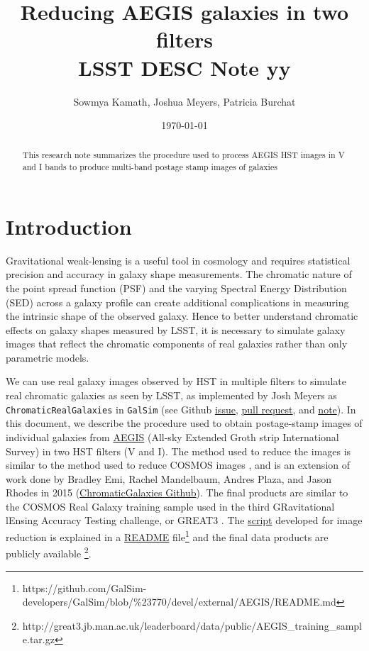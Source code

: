 \documentclass[a4paper,11pt]{article}
\title{Reducing AEGIS galaxies in two filters \\
LSST DESC Note yy}
\author{Sowmya Kamath, Joshua Meyers, Patricia Burchat}
\date{\today}
\begin{document}
\maketitle

\begin{abstract}
This research note summarizes the procedure used to process AEGIS HST images in V and I bands to produce multi-band postage stamp images of galaxies
\end{abstract}

\section{Introduction}
Gravitational weak-lensing is a useful tool in cosmology and requires statistical precision and accuracy in galaxy shape measurements. The chromatic nature of the point spread function (PSF) and the varying Spectral Energy Distribution (SED) across a galaxy profile can create additional complications in measuring the intrinsic shape of the observed galaxy. Hence to better understand chromatic effects on galaxy shapes measured by LSST, it is necessary to simulate galaxy images that reflect the chromatic components of real galaxies rather than only parametric models. 

We can use real galaxy images observed by HST in multiple filters to simulate real chromatic galaxies as seen by LSST, as implemented by Josh Meyers as {\tt ChromaticRealGalaxies} in {\tt GalSim} (see Github
\href{https://github.com/GalSim-developers/GalSim/issues/640}{issue}, 
\href{https://github.com/GalSim-developers/GalSim/pull/687}{pull request},
and 
\href{https://github.com/GalSim-developers/GalSim/blob/\%23640/devel/modules/CGNotes.pdf}{note}). 
In this document, we describe the procedure used to obtain postage-stamp images of individual galaxies from 
\href{http://aegis.ucolick.org/tech_overview.html}{AEGIS} 
(All-sky Extended Groth strip International Survey) in two HST filters (V and I). The method used to reduce the images is similar to the method used  to reduce COSMOS images \citep{Leauthaud2007}, and is an extension of work done by Bradley Emi, Rachel Mandelbaum, Andres Plaza, and Jason Rhodes in 2015 
(\href{https://github.com/bradleyemi/ChromaticGalaxies}{ChromaticGalaxies Github}). The final products are similar to the COSMOS Real Galaxy training sample used in the third GRavitational lEnsing Accuracy Testing challenge, or GREAT3 \citep{Mandelbaum2014}. The \href{https://github.com/sowmyakth/true_gal_colors}{script} developed for image reduction is explained in a \href{https://github.com/GalSim-developers/GalSim/blob/\%23770/devel/external/AEGIS/README.md}{README} file\footnote{https://github.com/GalSim-developers/GalSim/blob/\%23770/devel/external/AEGIS/README.md} and the final data products are publicly available \footnote{http://great3.jb.man.ac.uk/leaderboard/data/public/AEGIS\_training\_sample.tar.gz}.
\end{document}
